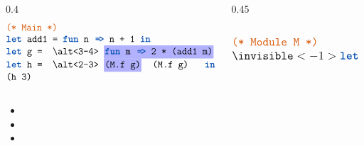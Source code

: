 \begin{frame}

  \Large
  \begin{columns}[t]
    \begin{column}{0.4\textwidth}
      \[
      \large
      \begin{array}{@{}ll@{}}
        \mex{\textcolor{dkcomment}{(* Main *)}}\\
        \mex{\kw{let} add1 = \kw{fun} n \codearr n + 1 \kw{in}} \\
        \mex{\kw{let} g = \altcolor{3-4}{blue}{\kw{fun} m \codearr 2 * (add1 m)} \kw{in}} \\
        \mex{\kw{let} h = \altcolor{2-3}{blue}{(M.f g)} \kw{in}} \\
        \mex{(h 3)}
      \end{array}
      \]
    \end{column}

    \begin{column}{0.45\textwidth}
      \[
      \large
      \begin{array}{@{}ll@{}}
        \\
        \mex{\textcolor{dkcomment}{(* Module M *)}}\\
        \invisible<-1>{\mex{\kw{let} f = \kw{fun} x \codearr x}}
      \end{array}
      \]
    \end{column}
  \end{columns}

  \vspace{1em}

  \begin{itemize}
  \item {}
  \item {}
  \item {}
  \end{itemize}


\end{frame}

